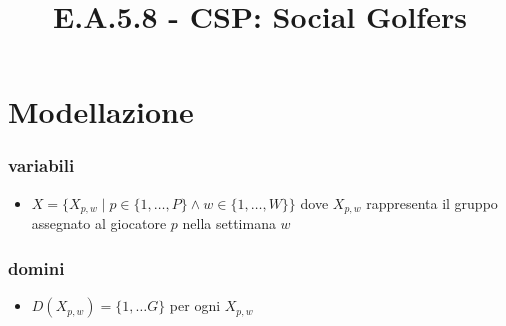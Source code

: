 \documentclass[12pt]{article}
\title{E.A.5.8 - CSP: Social Golfers}
\author{}
\date{}
\begin{document}
\maketitle
\vspace{-5em}
\section{Modellazione}


\subsubsection*{variabili}
\begin{itemize}
    \item $X = \{ X_{p, w} \mid p \in \{1, \dots, P\} \land w \in \{1, \dots, W\} \}$ dove $X_{p, w}$ rappresenta il gruppo assegnato al giocatore $p$ nella settimana $w$
\end{itemize}
\subsubsection*{domini}
\begin{itemize}
    \item $D(X_{p, w}) = \{1, \dots G\}$ per ogni $X_{p, w}$
\end{itemize}
\end{document}

